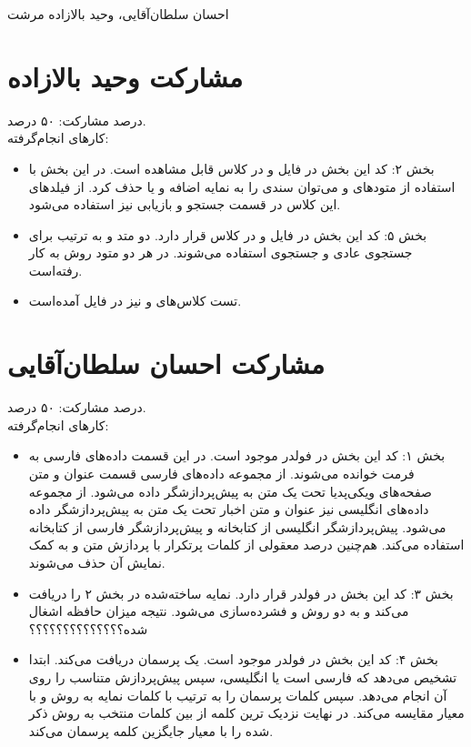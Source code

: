 \documentclass[11pt]{article}
\begin{document}
%
{احسان سلطان‌آقایی، وحید بالازاده مرشت}

\section*{مشارکت وحید بالازاده}
درصد مشارکت: ۵۰ درصد.\\

کارهای انجام‌گرفته:
\begin{itemize}
\item بخش ۲: کد این بخش در فایل  و در کلاس  قابل مشاهده است. در این بخش با استفاده از متودهای  و  می‌توان سندی را به نمایه اضافه و یا حذف کرد. از فیلدهای این کلاس در قسمت جستجو و بازیابی نیز استفاده می‌شود.
\item بخش ۵: کد این بخش در فایل  و در کلاس  قرار دارد. دو متد  و  به ترتیب برای جستجوی عادی و جستجوی  استفاده می‌شوند. در هر دو متود روش  به کار رفته‌است.
\item تست کلاس‌های  و  نیز در فایل  آمده‌است.
\end{itemize}
\section*{مشارکت احسان سلطان‌آقایی}
درصد مشارکت: ۵۰ درصد.\\

کارهای انجام‌گرفته:
\begin{itemize}
\item 
بخش ۱: کد این بخش در فولدر  موجود است. در این قسمت داده‌های فارسی به فرمت  خوانده می‌شوند. از مجموعه داده‌های فارسی قسمت عنوان و متن صفحه‌های ویکی‌پدیا تحت یک متن به پیش‌پردازشگر داده می‌شود. از مجموعه داده‌های انگلیسی نیز عنوان و متن اخبار تحت یک متن به پیش‌پردازشگر داده می‌شود. پیش‌پردازشگر انگلیسی از کتابخانه  و پیش‌پردازشگر فارسی از کتابخانه  استفاده می‌کند. هم‌چنین درصد معقولی از کلمات پرتکرار با پردازش متن و به کمک نمایش آن حذف می‌شوند.
\item 
بخش ۳: کد این بخش در فولدر  قرار دارد. نمایه ساخته‌شده در بخش ۲ را دریافت می‌کند و به دو روش  و  فشرده‌سازی می‌شود. نتیجه میزان حافظه اشغال شده؟؟؟؟؟؟؟؟؟؟؟؟؟؟ 
\item
بخش ۴: کد این بخش در فولدر  موجود است. یک پرسمان دریافت می‌کند. ابتدا تشخیص می‌دهد که فارسی است یا انگلیسی، سپس پیش‌پردازش متناسب را روی آن انجام می‌دهد. سپس کلمات پرسمان را به ترتیب با کلمات نمایه به روش  و با معیار  مقایسه می‌کند. در نهایت نزدیک ترین کلمه از بین کلمات منتخب به روش ذکر شده را با معیار  جایگزین کلمه پرسمان می‌کند.


\end{itemize}
\end{document}
